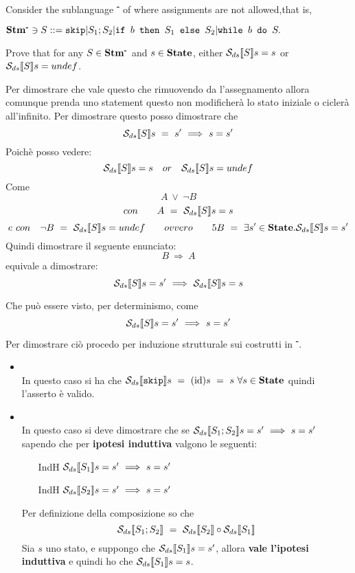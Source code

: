 \newcommand{\stmminus}{\stm{}\textsuperscript{\textbf{-}}}

{
    Consider the sublanguage \stmminus{} of \stm{} where assignments are not allowed,that is,
    \begin{center}
    $\stmminus{} \ni{} S ::= \skipistr | S_1;S_2 | \ifABC{b}{S_1}{S_2} | \wbS{b}{S}.$
    \end{center}
    Prove that for any $S\in\stmminus{}$ and $s\in\mbox{\textbf{State}}$, either $\mathcal{S}_{ds}\llbracket S \rrbracket{}s=s$ or $\mathcal{S}_{ds}\llbracket S \rrbracket{}s=undef$.
}
{
    Per dimostrare che vale questo che rimuovendo da \stm{} l'assegnamento
    allora comunque prenda uno statement questo non modificherà lo stato
    iniziale o ciclerà all'infinito. Per dimostrare questo posso dimostrare che 
    \[ \mathcal{S}_{ds}\llbracket S \rrbracket{}s~=~s'~\Longrightarrow~s=s' \]
    Poichè posso vedere: 
    \[ \mathcal{S}_{ds}\llbracket S \rrbracket{}s=s \quad or \quad \mathcal{S}_{ds}\llbracket S \rrbracket{}s=undef \]
    Come
    \[ A~\lor~\neg{}B \]
    \[ con \qquad A~=~\mathcal{S}_{ds}\llbracket S \rrbracket{}s=s \]
  \[  e~con \quad \neg{}B~=~\mathcal{S}_{ds}\llbracket S \rrbracket{}s=undef \qquad ovvero \qquad5    B~=~\exists{}s'\in\mbox{\textbf{State}}.\mathcal{S}_{ds}\llbracket S \rrbracket{}s=s' \]
    Quindi dimostrare il seguente enunciato:
    \[ B~\Longrightarrow~A \]
    equivale a dimostrare: 
\[ \mathcal{S}_{ds}\llbracket S \rrbracket{}s=s'~\Longrightarrow~\mathcal{S}_{ds}\llbracket S \rrbracket{}s=s \]

    Che può essere visto, per determinismo, come
    \[ \mathcal{S}_{ds}\llbracket S \rrbracket{}s=s'~\Longrightarrow~s=s' \]
    Per dimostrare ciò procedo per induzione strutturale sui costrutti in 
    \stmminus{}.

\begin{itemize}
	\item {} \\
	In questo caso si ha che $\mathcal{S}_{ds}\llbracket \textrm{\normalfont{\texttt{skip}}} \rrbracket s~
    =~(\textrm{\normalfont{id}})s~=~s~\forall{}s\in\mbox{\textbf{State}}$ quindi l'asserto è valido.

   \item {} \\
    In questo caso si deve dimostrare che
    se $\mathcal{S}_{ds}\llbracket S_1;S_2 \rrbracket s=s'~\Longrightarrow~s=s'$ sapendo che per \textbf{ipotesi
    induttiva} valgono le seguenti:
 \begin{itemize}
    \item[IndH] $\mathcal{S}_{ds}\llbracket S_1 \rrbracket s=s'~\Longrightarrow~s=s'$
    \item[IndH] $\mathcal{S}_{ds}\llbracket S_2 \rrbracket s=s'~\Longrightarrow~s=s'$
 \end{itemize}
    Per definizione della composizione so che 
    \[ \mathcal{S}_{ds}\llbracket S_1;S_2 \rrbracket~=~\mathcal{S}_{ds}\llbracket S_2 \rrbracket \circ \mathcal{S}_{ds}\llbracket S_1 \rrbracket \]
    Sia $s$ uno stato,
    e suppongo che $\mathcal{S}_{ds}\llbracket S_1 \rrbracket s=s'$, allora \textbf{vale l'ipotesi induttiva} e quindi
    ho che $\mathcal{S}_{ds}\llbracket S_1 \rrbracket s=s$. 
    

\end{itemize}}
